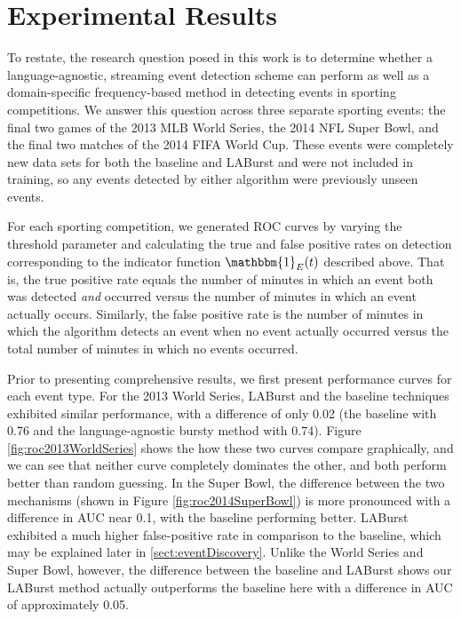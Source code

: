 \documentclass{sig-alternate}
\begin{document}
\section{Experimental Results}
\label{sect:results}

To restate, the research question posed in this work is to determine whether a language-agnostic, streaming event detection scheme can perform as well as a domain-specific frequency-based method in detecting events in sporting competitions.
We answer this question across three separate sporting events: the final two games of the 2013 MLB World Series, the 2014 NFL Super Bowl, and the final two matches of the 2014 FIFA World Cup.
These events were completely new data sets for both the baseline and LABurst and were not included in training, so any events detected by either algorithm were previously unseen events.

For each sporting competition, we generated ROC curves by varying the threshold parameter and calculating the true and false positive rates on detection corresponding to the indicator function $\mathbbm{1}_E(t)$ described above.
That is, the true positive rate equals the number of minutes in which an event both was detected \emph{and} occurred versus the number of minutes in which an event actually occurs.
Similarly, the false positive rate is the number of minutes in which the algorithm detects an event when no event actually occurred versus the total number of minutes in which no events occurred.

Prior to presenting comprehensive results, we first present performance curves for each event type.
For the 2013 World Series, LABurst and the baseline techniques exhibited similar performance, with a difference of only 0.02 (the baseline with 0.76 and the language-agnostic bursty method with 0.74).
Figure \ref{fig:roc2013WorldSeries} shows the how these two curves compare graphically, and we can see that neither curve completely dominates the other, and both perform better than random guessing.
In the Super Bowl, the difference between the two mechanisms (shown in Figure \ref{fig:roc2014SuperBowl}) is more pronounced with a difference in AUC near 0.1, with the baseline performing better.
LABurst exhibited a much higher false-positive rate in comparison to the baseline, which may be explained later in \ref{sect:eventDiscovery}.
Unlike the World Series and Super Bowl, however, the difference between the baseline and LABurst shows our LABurst method actually outperforms the baseline here with a difference in AUC of approximately 0.05.
\end{document}
